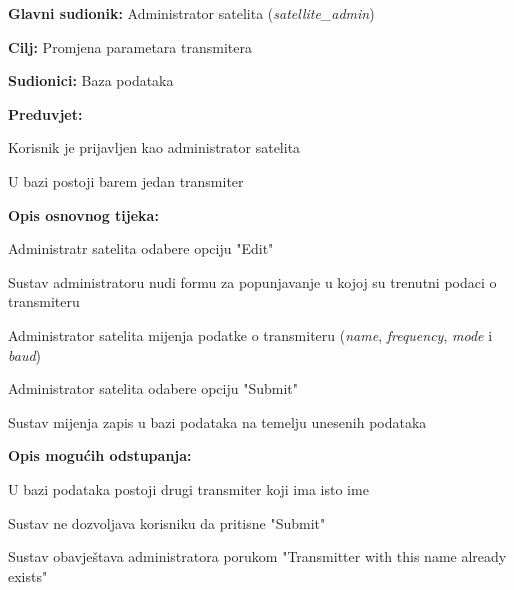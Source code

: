 			\noindent {}
			\begin{packed_item}
				
				\item \textbf{Glavni sudionik: }Administrator satelita (\textit{satellite\_admin})
				\item  \textbf{Cilj: }Promjena parametara transmitera
				\item  \textbf{Sudionici: }Baza podataka
				\item  \textbf{Preduvjet: }
				\begin{packed_enum}
					\item Korisnik je prijavljen kao administrator satelita
					\item U bazi postoji barem jedan transmiter \end{packed_enum}
				\item  \textbf{Opis osnovnog tijeka: }
				
				\item[] \begin{packed_enum}
					\item Administratr satelita odabere opciju "Edit"
					\item Sustav administratoru nudi formu za popunjavanje u kojoj su trenutni podaci o transmiteru
					\item Administrator satelita mijenja podatke o transmiteru (\textit{name}, \textit{frequency}, \textit{mode} i \textit{baud})
					\item Administrator satelita odabere opciju "Submit"
					\item Sustav mijenja zapis u bazi podataka na temelju unesenih podataka
					
				\end{packed_enum}
				
				\item  \textbf{Opis mogućih odstupanja: }
				
				\item[] \begin{packed_enum}
					
					\item[1] U bazi podataka postoji drugi transmiter koji ima isto ime
					\item[ ] \begin{packed_enum}
						
						\item[1.1] Sustav ne dozvoljava korisniku da pritisne "Submit"
						\item[1.2] Sustav obavještava administratora porukom "Transmitter with this name already exists"
					\end{packed_enum}
				\end{packed_enum}
			\end{packed_item}
			
